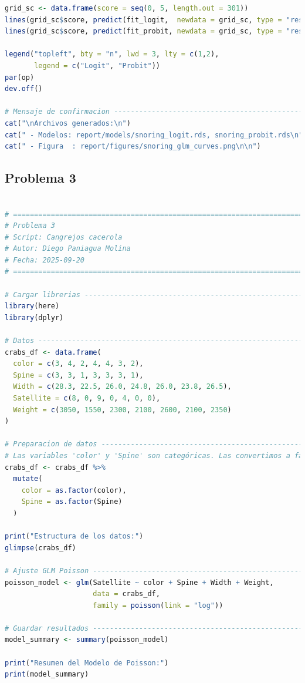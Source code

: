 \begin{lstlisting}[language=R, caption={Script: Ronquido y enfermedad cardiaca}, label={lst:script1}]
grid_sc <- data.frame(score = seq(0, 5, length.out = 301))
lines(grid_sc$score, predict(fit_logit,  newdata = grid_sc, type = "response"), lwd = 3)
lines(grid_sc$score, predict(fit_probit, newdata = grid_sc, type = "response"), lwd = 3, lty = 2)

legend("topleft", bty = "n", lwd = 3, lty = c(1,2),
       legend = c("Logit", "Probit"))
par(op)
dev.off()

# Mensaje de confirmacion -----------------------------------------------------
cat("\nArchivos generados:\n")
cat(" - Modelos: report/models/snoring_logit.rds, snoring_probit.rds\n")
cat(" - Figura  : report/figures/snoring_glm_curves.png\n\n")

\end{lstlisting}

\clearpage

\subsection{Problema \textcolor{CIMATRed}{3}}

\begin{lstlisting}[language=R, caption={Script: Cangrejos cacerola}, label={lst:script4}]

# =============================================================================
# Problema 3 
# Script: Cangrejos cacerola
# Autor: Diego Paniagua Molina
# Fecha: 2025-09-20
# =============================================================================

# Cargar librerias ------------------------------------------------------------
library(here)
library(dplyr) 

# Datos -----------------------------------------------------------------------
crabs_df <- data.frame(
  color = c(3, 4, 2, 4, 4, 3, 2),
  Spine = c(3, 3, 1, 3, 3, 3, 1),
  Width = c(28.3, 22.5, 26.0, 24.8, 26.0, 23.8, 26.5),
  Satellite = c(8, 0, 9, 0, 4, 0, 0),
  Weight = c(3050, 1550, 2300, 2100, 2600, 2100, 2350)
)

# Preparacion de datos -------------------------------------------------------
# Las variables 'color' y 'Spine' son categóricas. Las convertimos a factores.
crabs_df <- crabs_df %>%
  mutate(
    color = as.factor(color),
    Spine = as.factor(Spine)
  )

print("Estructura de los datos:")
glimpse(crabs_df)

# Ajuste GLM Poisson ----------------------------------------------------------
poisson_model <- glm(Satellite ~ color + Spine + Width + Weight, 
                     data = crabs_df, 
                     family = poisson(link = "log"))

# Guardar resultados ----------------------------------------------------------
model_summary <- summary(poisson_model)

print("Resumen del Modelo de Poisson:")
print(model_summary)

\end{lstlisting}



